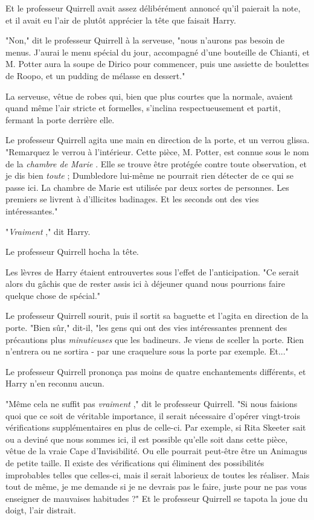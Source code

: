 Et le professeur Quirrell avait assez délibérément annoncé qu'il paierait la note, et il avait eu l'air de plutôt apprécier la tête que faisait Harry.

"Non," dit le professeur Quirrell à la serveuse, "nous n'aurons pas besoin de menus. J'aurai le menu spécial du jour, accompagné d'une bouteille de Chianti, et M. Potter aura la soupe de Dirico pour commencer, puis une assiette de boulettes de Roopo, et un pudding de mélasse en dessert."

La serveuse, vêtue de robes qui, bien que plus courtes que la normale, avaient quand même l'air stricte et formelles, s'inclina respectueusement et partit, fermant la porte derrière elle.

Le professeur Quirrell agita une main en direction de la porte, et un verrou glissa. "Remarquez le verrou à l'intérieur. Cette pièce, M. Potter, est connue sous le nom de la \emph{chambre de Marie} . Elle se trouve être protégée contre toute observation, et je dis bien \emph{toute}  ; Dumbledore lui-même ne pourrait rien détecter de ce qui se passe ici. La chambre de Marie est utilisée par deux sortes de personnes. Les premiers se livrent à d'illicites badinages. Et les seconds ont des vies intéressantes."

"\emph{Vraiment} ," dit Harry.

Le professeur Quirrell hocha la tête.

Les lèvres de Harry étaient entrouvertes sous l'effet de l'anticipation. "Ce serait alors du gâchis que de rester assis ici à déjeuner quand nous pourrions faire quelque chose de spécial."

Le professeur Quirrell sourit, puis il sortit sa baguette et l'agita en direction de la porte. "Bien sûr," dit-il, "les gens qui ont des vies intéressantes prennent des précautions plus \emph{minutieuses}  que les badineurs. Je viens de sceller la porte. Rien n'entrera ou ne sortira - par une craquelure sous la porte par exemple. Et..."

Le professeur Quirrell prononça pas moins de quatre enchantements différents, et Harry n'en reconnu aucun.

"Même cela ne suffit pas \emph{vraiment} ," dit le professeur Quirrell. "Si nous faisions quoi que ce soit de véritable importance, il serait nécessaire d'opérer vingt-trois vérifications supplémentaires en plus de celle-ci. Par exemple, si Rita Skeeter sait ou a deviné que nous sommes ici, il est possible qu'elle soit dans cette pièce, vêtue de la vraie Cape d'Invisibilité. Ou elle pourrait peut-être être un Animagus de petite taille. Il existe des vérifications qui éliminent des possibilités improbables telles que celles-ci, mais il serait laborieux de toutes les réaliser. Mais tout de même, je me demande si je ne devrais pas le faire, juste pour ne pas vous enseigner de mauvaises habitudes ?" Et le professeur Quirrell se tapota la joue du doigt, l'air distrait.


